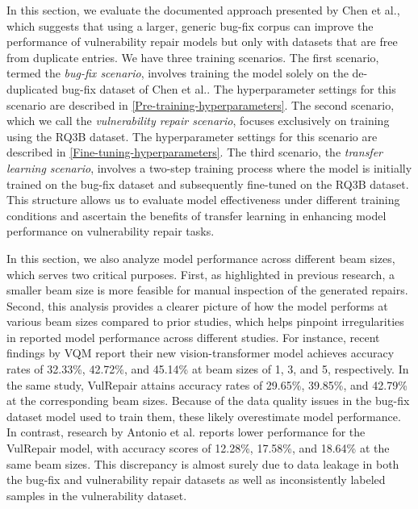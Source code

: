 In this section, we evaluate the documented approach presented by Chen et al.\cite{chen2022neural}, which suggests that using a larger, generic bug-fix corpus can improve the performance of vulnerability repair models but only with datasets that are free from duplicate entries.
We have three training scenarios. The first scenario, termed the \emph{bug-fix scenario}, involves training the model solely on the de-duplicated bug-fix dataset of Chen et al.\cite{chen2022neural}. The hyperparameter settings for this scenario are described in \ref{Pre-training-hyperparameters}.
The second scenario, which we call the \emph{vulnerability repair scenario}, focuses exclusively on training using the RQ3B dataset.
The hyperparameter settings for this scenario are described in \ref{Fine-tuning-hyperparameters}.
The third scenario, the \emph{transfer learning scenario}, involves a two-step training process where the model is initially trained on the bug-fix dataset and subsequently fine-tuned on the RQ3B dataset. 
This structure allows us to evaluate model effectiveness under different training conditions and ascertain the benefits of transfer learning in enhancing model performance on vulnerability repair tasks.

In this section, we also analyze model performance across different beam sizes, which serves two critical purposes.
First, as highlighted in previous research, a smaller beam size is more feasible for manual inspection of the generated repairs\cite{fu2024vision,mastropaolo2024training}.
Second, this analysis provides a clearer picture of how the model performs at various beam sizes compared to prior studies, which helps pinpoint irregularities in reported model performance across different studies.
For instance, recent findings by VQM \cite{fu2024vision} report their new vision-transformer model achieves accuracy rates of 32.33\%, 42.72\%, and 45.14\% at beam sizes of 1, 3, and 5, respectively. In the same study, VulRepair attains accuracy rates of 29.65\%, 39.85\%, and 42.79\% at the corresponding beam sizes.
Because of the data quality issues in the bug-fix dataset model used to train them, these likely overestimate model performance.
In contrast, research by Antonio et al.\cite{mastropaolo2024training} reports lower performance for the VulRepair model, with accuracy scores of 12.28\%, 17.58\%, and 18.64\% at the same beam sizes. This discrepancy is almost surely due to data leakage in both the bug-fix and vulnerability repair datasets as well as inconsistently labeled samples in the vulnerability dataset.




